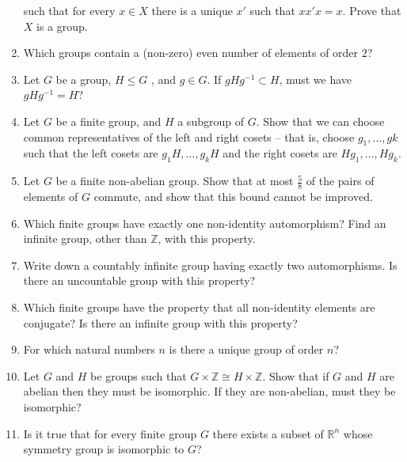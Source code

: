 \documentclass[a4paper, 12pt]{article}
\begin{document}
\begin{enumerate}
            such that for every $x \in X$ there is a unique $x'$ such that $xx'x =x$.
            Prove that $X$ is a group.
            \item Which groups contain a (non-zero) even number of elements of order $2$?
            \item Let $G$ be a group, $H \leq G$ , and $g \in G$. If $gHg^{-1} \subset H$,
            must we have $gHg^{-1} = H$?
            \item Let $G$ be a finite group, and $H$ a subgroup of $G$. Show that we can 
            choose common representatives of the left and right cosets – that is,
            choose $g_1, \ldots, gk$ such that the left cosets are $g_1 H, \ldots, g_k H$
            and the right cosets are $H g_1, \ldots, H g_k$.
            \item Let $G$ be a finite non-abelian group. Show that at most $\frac{5}{8}$ of the pairs
            of elements of $G$ commute, and show that this bound cannot be improved.
            \item Which finite groups have exactly one non-identity automorphism?  Find an infinite
            group, other than $\mathbb{Z}$, with this property.
            \item Write down a countably infinite group having exactly two automorphisms. Is there an
            uncountable group with this property?
            \item Which finite groups have the property that all non-identity elements are conjugate?
            Is there an infinite group with this property?
            \item For which natural numbers $n$ is there a unique group of order $n$?
            \item Let $G$ and $H$ be groups such that $G \times \mathbb{Z} \cong H \times \mathbb{Z}$.
            Show that if $G$ and $H$ are abelian then they must be isomorphic. If they are non-abelian,
            must they be isomorphic?
            \item Is it true that for every finite group $G$ there exists a subset of $\mathbb{R}^n$
            whose symmetry group is isomorphic to $G$?
      \end{enumerate}
\end{document}
